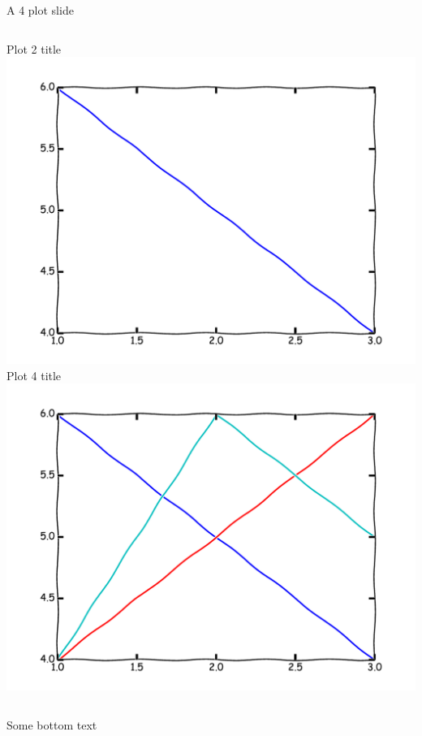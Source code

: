 \begin{frame}{A 4 plot slide}
\begin{columns}
\begin{column}{0.4\textwidth}
\begin{center}
Plot 2 title
\\
\includegraphics[width=\textwidth]{example/plot2.pdf}
\\
Plot 4 title
\\
\includegraphics[width=\textwidth]{example/plot4.pdf}
\\
\end{center}
\end{column}
\end{columns}
Some bottom text
\end{frame}

